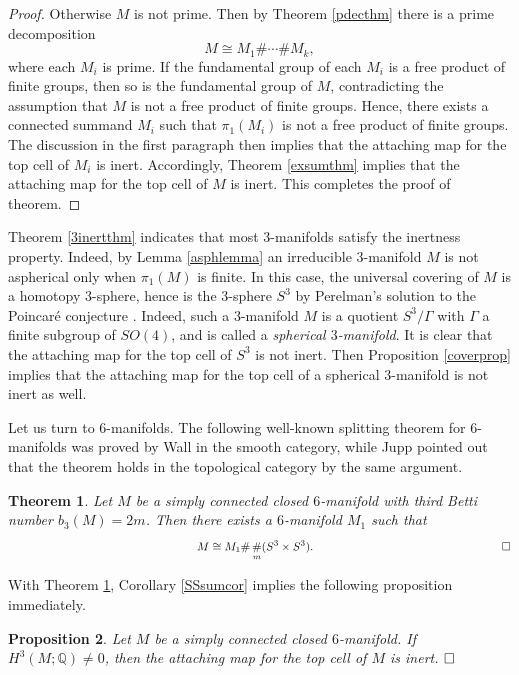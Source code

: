 \documentclass[a4]{amsart}
\newtheorem{theorem}{Theorem}[section]
\newtheorem{proposition}[theorem]{Proposition}
\theoremstyle{definition}
\newcommand{\qqed}{\hfill\Box}
\begin{document}
\begin{sloppypar}
\begin{proof}
Otherwise $M$ is not prime. Then by Theorem \ref{pdecthm} there is a prime decomposition 
\[
M\cong M_1\#\cdots \# M_k,
\]
where each $M_i$ is prime. If the fundamental group of each $M_i$ is a free product of finite groups, then so is the fundamental group of $M$, contradicting the assumption that $M$ is not a free product of finite groups. Hence, there exists a connected summand $M_i$ such that $\pi_1(M_i)$ is not a free product of finite groups. The discussion in the first paragraph then implies that the attaching map for the top cell of $M_i$ is inert. Accordingly, Theorem \ref{exsumthm} implies that the attaching map for the top cell of $M$ is inert. This completes the proof of theorem. 
\end{proof}

Theorem \ref{3inertthm} indicates that most $3$-manifolds satisfy the inertness property. Indeed, by Lemma \ref{asphlemma} an irreducible $3$-manifold $M$ is not aspherical only when $\pi_1(M)$ is finite. In this case, the universal covering of $M$ is a homotopy $3$-sphere, hence is the $3$-sphere $S^3$ by Perelman's solution to the Poincar\'{e} conjecture \cite{Per02, Per03a, Per03b}. Indeed, such a $3$-manifold $M$ is a quotient $S^3/\Gamma$ with $\Gamma$ a finite subgroup of $SO(4)$, and is called a {\it spherical $3$-manifold}. 
It is clear that the attaching map for the top cell of $S^3$ is not inert. Then Proposition \ref{coverprop} implies that the attaching map for the top cell of a spherical $3$-manifold is not inert as well.  



Let us turn to $6$-manifolds. 
The following well-known splitting theorem for $6$-manifolds was proved by Wall \cite{Wal66} in the smooth category, while Jupp \cite{Jup73} pointed out that the theorem holds in the topological category by the same argument.
\begin{theorem}\cite[Theorem 1]{Wal66}\label{wallsplitthm}
Let $M$ be a simply connected closed $6$-manifold with third Betti number $b_3(M)=2m$. Then there exists a $6$-manifold $M_1$ such that
\[
 \hspace{5.8cm}
M\cong M_1 \# \mathop{\#}\limits_{m} (S^3\times S^3).
 \hspace{5.8cm}\Box
\]
\end{theorem}
With Theorem \ref{wallsplitthm}, Corollary \ref{SSsumcor} implies the following proposition immediately.
\begin{proposition}\label{wallinertprop}
Let $M$ be a simply connected closed $6$-manifold. If $H^3(M;\mathbb{Q})\neq 0$, then the attaching map for the top cell of $M$ is inert.   $\qqed$ 
\end{proposition}


\end{sloppypar}
\end{document}
